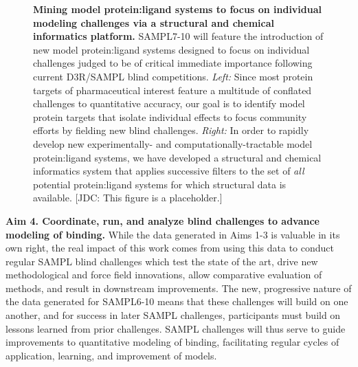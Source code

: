 \documentclass[11pt]{article}
\begin{document}
\begin{figure}[h]
\begin{centering}

\end{centering}
\vspace{0.1in}
\caption{\footnotesize {\bf Mining model protein:ligand systems to focus on individual modeling challenges via a structural and chemical informatics platform.}
SAMPL7-10 will feature the introduction of new model protein:ligand systems designed to focus on individual challenges judged to be of critical immediate importance following current D3R/SAMPL blind competitions.
\emph{Left:} Since most protein targets of pharmaceutical interest feature a multitude of conflated challenges to quantitative accuracy, our goal is to identify model protein targets that isolate individual effects to focus community efforts by fielding new blind challenges.
\emph{Right:} In order to rapidly develop new experimentally- and computationally-tractable model protein:ligand systems, we have developed a structural and chemical informatics system that applies successive filters to the set of \emph{all} potential protein:ligand systems for which structural data is available.
{\color{red}[JDC: This figure is a placeholder.]}
\label{figure:mining-for-model-systems}}
\end{figure}



{\bf Aim 4. Coordinate, run, and analyze blind challenges to advance modeling of binding.}
While the data generated in Aims 1-3 is valuable in its own right, the real impact of this work comes from using this data to conduct regular SAMPL blind challenges which test the state of the art, drive new methodological and force field innovations, allow comparative evaluation of methods, and result in downstream improvements.
The new, progressive nature of the data generated for SAMPL6-10 means that these challenges will build on one another, and for success in later SAMPL challenges, participants must build on lessons learned from prior challenges.
SAMPL challenges will thus serve to guide improvements to quantitative modeling of binding, facilitating regular cycles of application, learning, and improvement of models.
\end{document}
